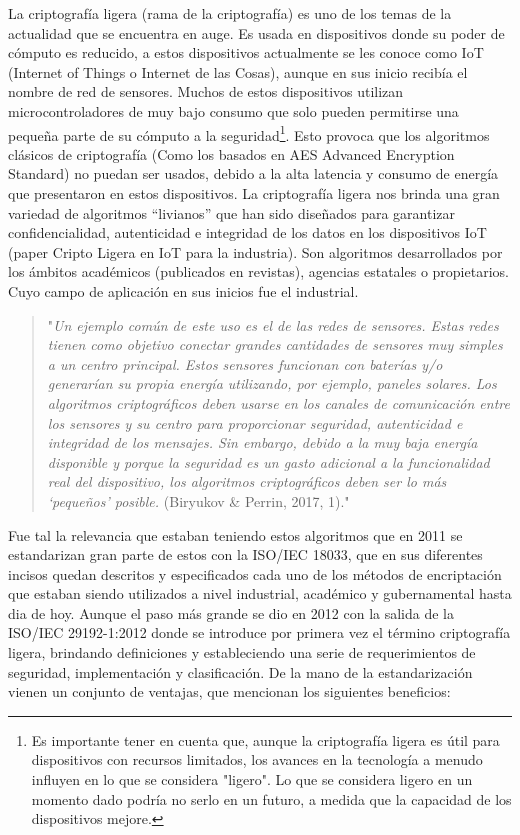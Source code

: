 \documentclass[]{article}
\begin{document}
La criptografía ligera (rama de la criptografía) es uno de los temas de la actualidad que se encuentra en auge. Es usada en dispositivos donde su poder de cómputo es reducido, a estos dispositivos actualmente se les conoce como IoT (Internet of Things o Internet de las Cosas), aunque en sus inicio recibía el nombre de red de sensores. Muchos de estos dispositivos utilizan microcontroladores de muy bajo consumo que solo pueden permitirse una pequeña parte de su cómputo a la seguridad\footnote{Es importante tener en cuenta que, aunque la criptografía ligera es útil para dispositivos con recursos limitados, los avances en la tecnología a menudo influyen en lo que se considera "ligero". Lo que se considera ligero en un momento dado podría no serlo en un futuro, a medida que la capacidad de los dispositivos mejore.}. Esto provoca que los algoritmos clásicos de criptografía (Como los basados en AES Advanced Encryption Standard) no puedan ser usados, debido a la alta latencia y consumo de energía que presentaron en estos dispositivos. La criptografía ligera nos brinda una gran variedad de algoritmos “livianos” que han sido diseñados para garantizar confidencialidad, autenticidad e integridad de los datos en los dispositivos IoT (paper Cripto Ligera en IoT para la industria). Son algoritmos desarrollados por los ámbitos académicos (publicados en revistas), agencias estatales o propietarios. Cuyo campo de aplicación en sus inicios fue el industrial.
\begin{quote}
	"\textit{Un ejemplo común de este uso es el de las redes de sensores. Estas redes tienen como objetivo conectar grandes cantidades de sensores muy simples a un centro principal. Estos sensores funcionan con baterías y/o generarían su propia energía utilizando, por ejemplo, paneles solares. Los algoritmos criptográficos deben usarse en los canales de comunicación entre los sensores y su centro para proporcionar seguridad, autenticidad e integridad de los mensajes. Sin embargo, debido a la muy baja energía disponible y porque la seguridad es un gasto adicional a la funcionalidad real del dispositivo, los algoritmos criptográficos deben ser lo más ‘pequeños’ posible.} (Biryukov \& Perrin, 2017, 1)."
\end{quote}
Fue tal la relevancia que estaban teniendo estos algoritmos que en 2011 se estandarizan gran parte de estos con la ISO/IEC 18033, que en sus diferentes incisos quedan descritos y especificados cada uno de los métodos de encriptación que estaban siendo utilizados a nivel industrial, académico y gubernamental hasta dia de hoy. Aunque el paso más grande se dio en 2012 con la salida de la ISO/IEC 29192-1:2012 donde se introduce por primera vez el término criptografía ligera, brindando definiciones y estableciendo una serie de requerimientos de seguridad, implementación y clasificación. De la mano de la estandarización vienen un conjunto de ventajas, que \cite{eterovic15stream} mencionan los siguientes beneficios:
\end{document}
